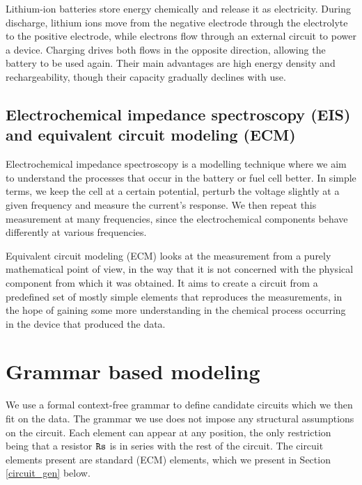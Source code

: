 \documentclass[
    11pt,
    a4paper,
    oneside
]{article}
\newcommand{\term}[1]{\text{\texttt{#1}}}
\begin{document}
Lithium-ion batteries store energy chemically and release it as electricity. During discharge, lithium ions move from the negative electrode through the electrolyte to the positive electrode, 
while electrons flow through an external circuit to power a device. Charging drives both flows in the opposite direction, allowing the battery to be used again. 
Their main advantages are high energy density and rechargeability, though their capacity gradually declines with use.

\subsection{Electrochemical impedance spectroscopy (EIS) and equivalent circuit modeling (ECM)}

Electrochemical impedance spectroscopy is a modelling technique where we aim to understand the processes that occur in the battery or fuel cell better. In simple terms, we 
keep the cell at a certain potential, perturb the voltage slightly at a given frequency and measure the current's response. We then repeat this measurement at many frequencies, since the
electrochemical components behave differently at various frequencies.

Equivalent circuit modeling (ECM) looks at the measurement from a purely mathematical point of view, in the way that it is not concerned with the physical component from which it was obtained.
It aims to create a circuit from a predefined set of mostly simple elements that reproduces the measurements, in the hope of gaining some more understanding in the chemical process occurring
in the device that produced the data. 

\section{Grammar based modeling}


We use a formal context-free grammar to define candidate circuits which we then fit on the data. The grammar we use does not impose any structural
assumptions on the circuit. Each element can appear at any position, the only restriction being that a resistor $\term{Rs}$ is in series
with the rest of the circuit. The circuit elements present are standard (ECM) elements, which we present in Section \ref{circuit_gen} below.
\end{document}
